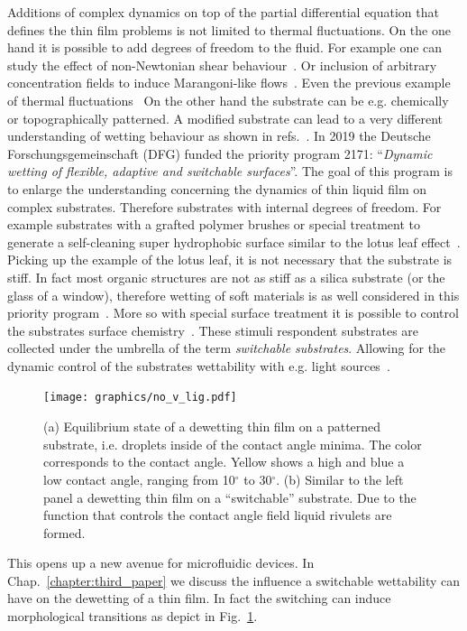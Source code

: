 Additions of complex dynamics on top of the partial differential equation that defines the thin film problems is not limited to thermal fluctuations.
On the one hand it is possible to add degrees of freedom to the fluid. 
For example one can study the effect of non-Newtonian shear behaviour~\cite{zhang2005non, myers2005application}. 
Or inclusion of arbitrary concentration fields to induce Marangoni-like flows~\cite{sultan_boudaoud_amar_2005, C5SM01603G, PhysRevLett.93.247803}.
Even the previous example of thermal fluctuations~\cite{Grun2006, Mecke_2005, PhysRevLett.95.244505, PhysRevE.104.034801}
On the other hand the substrate can be e.g. chemically or topographically patterned.
A modified substrate can lead to a very different understanding of wetting behaviour as shown in refs.~\cite{cassie1944wettability, WHYMAN2008355}.
In 2019 the Deutsche Forschungsgemeinschaft (DFG) funded the priority program 2171: ``\textit{Dynamic wetting of flexible, adaptive and switchable surfaces}''.
The goal of this program is to enlarge the understanding concerning the dynamics of thin liquid film on complex substrates.
Therefore substrates with internal degrees of freedom.
For example substrates with a grafted polymer brushes or special treatment to generate a self-cleaning super hydrophobic surface similar to the lotus leaf effect~\cite{doi:10.1021/acs.langmuir.0c03226, thiele2020gradient, doi:10.1021/acsnano.9b08211}.
Picking up the example of the lotus leaf, it is not necessary that the substrate is stiff.
In fact most organic structures are not as stiff as a silica substrate (or the glass of a window), therefore wetting of soft materials is as well considered in this priority program~\cite{doi:10.1146/annurev-fluid-010719-060147, https://doi.org/10.1002/nme.6567, chen2011short}.
More so with special surface treatment it is possible to control the substrates surface chemistry~\cite{xin2010reversibly, WANG200718}.
These stimuli respondent substrates are collected under the umbrella of the term \textit{switchable substrates}.
Allowing for the dynamic control of the substrates wettability with e.g. light sources~\cite{doi:10.1126/science.288.5471.1624, doi:10.1246/bcsj.20180076}.
\begin{figure}
    \centering
    \texttt{[image: graphics/no\_v\_lig.pdf]}
    \caption{(a) Equilibrium state of a dewetting thin film on a patterned substrate, i.e. droplets inside of the contact angle minima. 
    The color corresponds to the contact angle. 
    Yellow shows a high and blue a low contact angle, ranging from 10$^{\circ}$ to 30$^{\circ}$. 
    (b) Similar to the left panel a dewetting thin film on a ``switchable'' substrate. 
    Due to the function that controls the contact angle field liquid rivulets are formed.}
    \label{fig:morph_transition}
\end{figure}
This opens up a new avenue for microfluidic devices.
In Chap.~\ref{chapter:third_paper} we discuss the influence a switchable wettability can have on the dewetting of a thin film.
In fact the switching can induce morphological transitions as depict in Fig.~\ref{fig:morph_transition}. 

